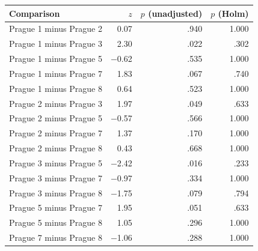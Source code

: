 \begin{tabular}{lrrr}
  \toprule
Comparison & $z$ & $p$ (unadjusted) & $p$ (Holm) \\ 
  \midrule
Prague 1 minus Prague 2 & 0.07 & .940 & 1.000 \\ 
  Prague 1 minus Prague 3 & 2.30 & .022 & .302 \\ 
  Prague 1 minus Prague 5 & $-$0.62 & .535 & 1.000 \\ 
  Prague 1 minus Prague 7 & 1.83 & .067 & .740 \\ 
  Prague 1 minus Prague 8 & 0.64 & .523 & 1.000 \\ 
  Prague 2 minus Prague 3 & 1.97 & .049 & .633 \\ 
  Prague 2 minus Prague 5 & $-$0.57 & .566 & 1.000 \\ 
  Prague 2 minus Prague 7 & 1.37 & .170 & 1.000 \\ 
  Prague 2 minus Prague 8 & 0.43 & .668 & 1.000 \\ 
  Prague 3 minus Prague 5 & $-$2.42 & .016 & .233 \\ 
  Prague 3 minus Prague 7 & $-$0.97 & .334 & 1.000 \\ 
  Prague 3 minus Prague 8 & $-$1.75 & .079 & .794 \\ 
  Prague 5 minus Prague 7 & 1.95 & .051 & .633 \\ 
  Prague 5 minus Prague 8 & 1.05 & .296 & 1.000 \\ 
  Prague 7 minus Prague 8 & $-$1.06 & .288 & 1.000 \\ 
   \bottomrule
\end{tabular}
